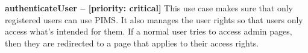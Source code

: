 \begin{description}
		\item{\textbf{authenticateUser -- [priority: critical]}}
	This use case makes sure that only registered users can use PIMS. It also manages the user rights so that users only access what's intended for them. If a normal user tries to access admin pages, then they are redirected to a page that applies to their access rights.
\end{description}